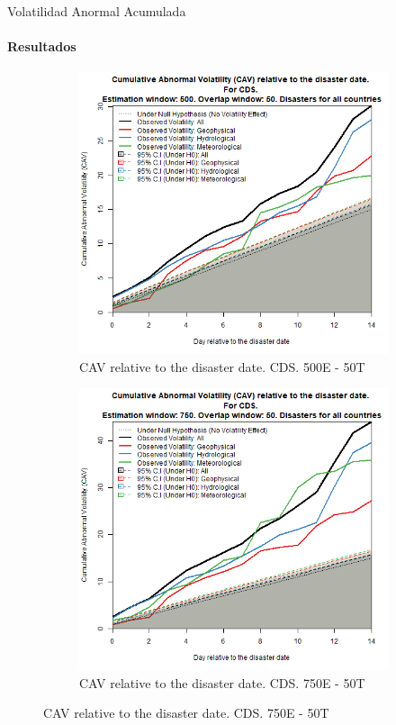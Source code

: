 \documentclass{beamer}
\begin{document}
\begin{frame}{Volatilidad Anormal Acumulada}
\framesubtitle{Resultados}
    \begin{figure}
    \begin{subfigure}{0.45\textwidth}
        \centering
        \includegraphics[width=\linewidth]{../Graficos_Paper/CAV/Ag/cds_PM_CAV_Est_500_tra_50.png}
        \caption{CAV relative to the disaster date. CDS. 500E - 50T}
        \label{figure:cavcds50050}
    \end{subfigure}
    \hfill
    \begin{subfigure}{0.45\textwidth}
        \centering
        \includegraphics[width=\linewidth]{../Graficos_Paper/CAV/Ag/cds_PM_CAV_Est_750_tra_50.png}
        \caption{CAV relative to the disaster date. CDS. 750E - 50T}
        \label{figure:cavcds75050}
    \end{subfigure}
    \end{figure}
\end{frame}
\end{document}
